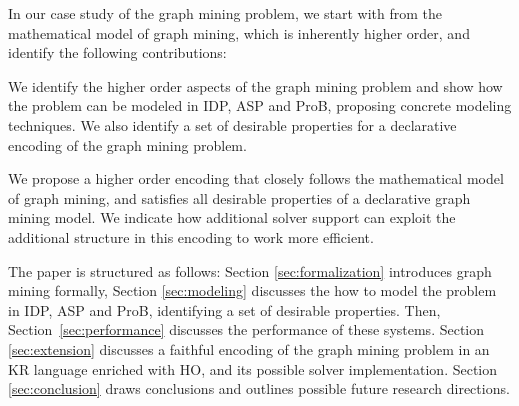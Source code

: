 In our case study of the graph mining problem, we start with from the mathematical model of graph mining, which is inherently higher order, and identify the following contributions:
\begin{compactitem}
\item We identify the higher order aspects of the graph mining problem and show how the problem can be modeled in IDP, ASP and ProB, proposing concrete modeling techniques.
We also identify a set of desirable properties for a declarative encoding of the graph mining problem.
\item 
We propose a higher order encoding that closely follows the mathematical model of graph mining, and satisfies all desirable properties of a declarative graph mining model.
We indicate how additional solver support can exploit the additional structure in this encoding to work more efficient.
\end{compactitem}
The paper is structured as follows: Section \ref{sec:formalization} introduces graph mining formally, Section \ref{sec:modeling} discusses the how to model the problem in IDP, ASP and ProB, identifying a set of desirable properties.
Then, Section~\ref{sec:performance} discusses the performance of these systems.
Section \ref{sec:extension} discusses a faithful encoding of the graph mining problem in an KR language enriched with HO, and its possible solver implementation. Section \ref{sec:conclusion} draws conclusions and outlines possible future research directions.
